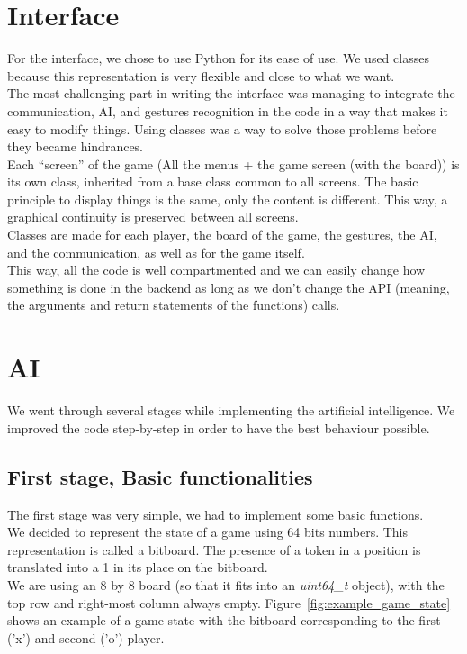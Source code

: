 \documentclass[11pt, a4paper, oneside]{report}
\begin{document}
	\section{Interface}
	For the interface, we chose to use Python for its ease of use. We used classes because this representation is very flexible and close to what we want. \\
	The most challenging part in writing the interface was managing to integrate the communication, AI, and gestures recognition in the code in a way that makes it easy to modify things. Using classes was a way to solve those problems before they became hindrances. \\

	Each “screen” of the game (All the menus + the game screen (with the board)) is its own class, inherited from a base class common to all screens. The basic principle to display things is the same, only the content is different. This way, a graphical continuity is preserved between all screens. \\

	Classes are made for each player, the board of the game, the gestures, the AI, and the communication, as well as for the game itself. \\
	This way, all the code is well compartmented and we can easily change how something is done in the backend as long as we don't change the API (meaning, the arguments and return statements of the functions) calls. \\

	\section{AI}\label{AI_section}

	We went through several stages while implementing the artificial intelligence. We improved the code step-by-step in order to have the best behaviour possible. \\

	\subsection{First stage, Basic functionalities}

	The first stage was very simple, we had to implement some basic functions. \\
	We decided to represent the state of a game using 64 bits numbers. This representation is called a bitboard. The presence of a token in a position is translated into a 1 in its place on the bitboard. \\
	We are using an 8 by 8 board (so that it fits into an \textit{uint64\_t} object), with the top row and right-most column always empty. Figure~\ref{fig:example_game_state} shows an example of a game state with the bitboard corresponding to the first ('x') and second ('o') player.
\end{document}
